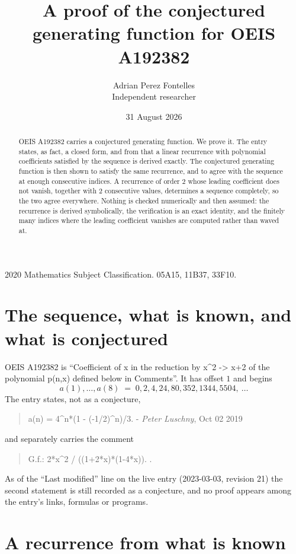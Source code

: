 \documentclass[11pt,a4paper]{article}
\title{A proof of the conjectured generating function for OEIS A192382}
\author{Adrian Perez Fontelles\\ \small Independent researcher}
\date{31 August 2026}
\theoremstyle{plain}
\theoremstyle{definition}
\begin{document}
\maketitle

\begin{abstract}
OEIS A192382 carries a conjectured generating function. We prove it. The entry states, as fact,
a closed form, and from that a linear recurrence with polynomial coefficients satisfied by
the sequence is derived exactly. The conjectured generating function is then shown to satisfy the
same recurrence, and to agree with the sequence at enough consecutive indices. A recurrence
of order $2$ whose leading coefficient does not vanish, together with $2$
consecutive values, determines a sequence completely, so the two agree everywhere. Nothing
is checked numerically and then assumed: the recurrence is derived symbolically, the
verification is an exact identity, and the finitely many indices where the leading
coefficient vanishes are computed rather than waved at.
\end{abstract}

\noindent\small 2020 Mathematics Subject Classification. 05A15, 11B37, 33F10.\normalsize

\section{The sequence, what is known, and what is conjectured}

OEIS A192382 is ``Coefficient of x in the reduction by x\textasciicircum{}2 -> x+2 of the polynomial p(n,x) defined below in Comments''. It has offset $1$ and begins
\[
a(1),\dots,a(8)\;=\;0, 2, 4, 24, 80, 352, 1344, 5504,\ \dots
\]
The entry states, not as a conjecture,
\begin{quote}\small
a(n) = 4\textasciicircum{}n*(1 - (-1/2)\textasciicircum{}n)/3. - \emph{Peter Luschny}, Oct 02 2019
\end{quote}
and separately carries the comment
\begin{quote}\small
G.f.: 2*x\textasciicircum{}2 / ((1+2*x)*(1-4*x)). .
\end{quote}
As of the ``Last modified'' line on the live entry (2023-03-03, revision 21) the second
statement is still recorded as a conjecture, and no proof appears among the entry's links,
formulas or programs.

\section{A recurrence from what is known}
\end{document}
